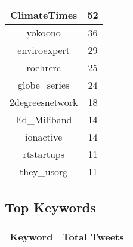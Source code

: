\documentclass{article}\usepackage[T1]{fontenc}
\begin{document}
\begin{tabular}{|c|c|}
 \hline
ClimateTimes & 52\\ 
 \hline
yokoono & 36\\ 
 \hline
enviroexpert & 29\\ 
 \hline
roehrerc & 25\\ 
 \hline
globe\_series & 24\\ 
 \hline
2degreesnetwork & 18\\ 
 \hline
Ed\_Miliband & 14\\ 
 \hline
ionactive & 14\\ 
 \hline
rtstartups & 11\\ 
 \hline
they\_usorg & 11\\ 
 \hline
\end{tabular}\subsection*{Top Keywords}\begin{tabular}{|c|c|}         \hline         Keyword & Total Tweets \\ 
 \hline
\end{tabular}
\end{document}
